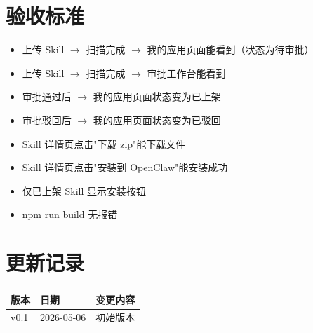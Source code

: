 \documentclass[11pt,a4paper]{article}
\begin{document}
\section{验收标准}

\begin{itemize}
  \item[$\square$] 上传 Skill $\to$ 扫描完成 $\to$ 我的应用页面能看到（状态为待审批）
  \item[$\square$] 上传 Skill $\to$ 扫描完成 $\to$ 审批工作台能看到
  \item[$\square$] 审批通过后 $\to$ 我的应用页面状态变为已上架
  \item[$\square$] 审批驳回后 $\to$ 我的应用页面状态变为已驳回
  \item[$\square$] Skill 详情页点击"下载 zip"能下载文件
  \item[$\square$] Skill 详情页点击"安装到 OpenClaw"能安装成功
  \item[$\square$] 仅已上架 Skill 显示安装按钮
  \item[$\square$] npm run build 无报错
\end{itemize}

\section*{更新记录}

\begin{tabular}{lll}
\toprule
版本 & 日期 & 变更内容 \\
\midrule
v0.1 & 2026-05-06 & 初始版本 \\
\bottomrule
\end{tabular}
\end{document}
